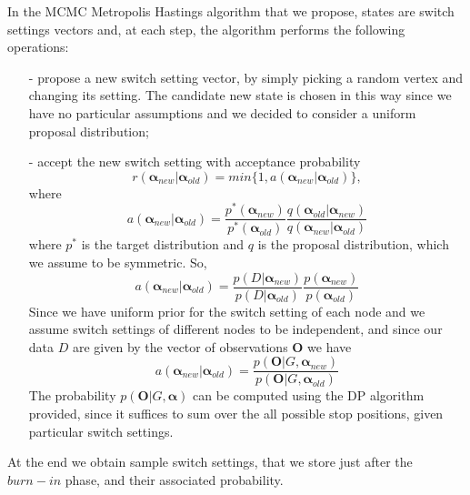 \documentclass[]{article}
\begin{document}
	In the MCMC Metropolis Hastings algorithm that we propose, states are switch settings vectors and, at each step, the algorithm performs the following operations:
	\begin{enumerate}
		\item[-] propose a new switch setting vector, by simply picking a random vertex and changing its setting. The candidate new state is chosen in this way since we have no particular assumptions and we decided to consider a uniform proposal distribution;
		\item[-] accept the new switch setting with acceptance probability 
		$$
		r(\mathbf{\alpha}_{new}|\mathbf{\alpha}_{old}) = min\{1, a(\mathbf{\alpha}_{new}|\mathbf{\alpha}_{old})\},
		$$
		where
		$$
		a(\mathbf{\alpha}_{new}|\mathbf{\alpha}_{old}) = \frac{p^*(\mathbf{\alpha}_{new})}{p^*(\mathbf{\alpha}_{old})}\frac{q(\mathbf{\alpha}_{old}|\mathbf{\alpha}_{new})}{q(\mathbf{\alpha}_{new}|\mathbf{\alpha}_{old})} 
		$$
		where $p^*$ is the target distribution and $q$ is the proposal distribution, which we assume to be symmetric. So,
		$$
		a(\mathbf{\alpha}_{new}|\mathbf{\alpha}_{old}) = \frac{p(D|\mathbf{\alpha}_{new})}{p(D|\mathbf{\alpha}_{old})} \frac{p(\mathbf{\alpha}_{new})}{p(\mathbf{\alpha}_{old})}
		$$
		Since we have uniform prior for the switch setting of each node and we assume switch settings of different nodes to be independent, and since our data $D$ are given by the vector of observations $\mathbf{O}$ we have
		$$
		a(\mathbf{\alpha}_{new}|\mathbf{\alpha}_{old}) = \frac{p(\mathbf{O}|G,\mathbf{\alpha}_{new})}{p(\mathbf{O}|G,\mathbf{\alpha}_{old})}
		$$
		The probability $p(\mathbf{O}|G,\mathbf{\alpha})$ can be computed using the DP algorithm provided, since it suffices to sum over the all possible stop positions, given particular switch settings. 
	\end{enumerate}
	At the end we obtain sample switch settings, that we store just after the $burn-in$ phase, and their associated probability.
	
\end{document}
